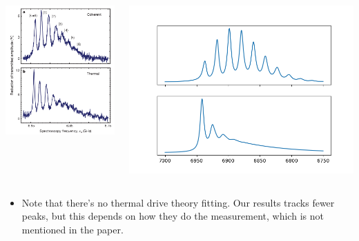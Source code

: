 \documentclass[12pt,hyperref={CJKbookmarks=true}]{beamer}
\begin{document}
\begin{frame}[t]
\begin{columns}
\begin{column}{0.4\linewidth}
    \centering
    \includegraphics[width=\linewidth]{thermal_origin.png}
\end{column}%
\begin{column}{0.6\linewidth}
	\centering
    \includegraphics[width=\linewidth]{thermal.png}
\end{column}
\end{columns}
\begin{itemize}
	\item Note that there's no thermal drive theory fitting. 
	Our results tracks fewer peaks, but this depends on 
	how they do the measurement, which is not mentioned in the paper. 
\end{itemize}
\end{frame}
\end{document}
